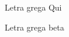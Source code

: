 
\begin{simbolos}
  \item[$ \chi  $] Letra grega Qui
  \item[$ \beta $] Letra grega beta
\end{simbolos}

